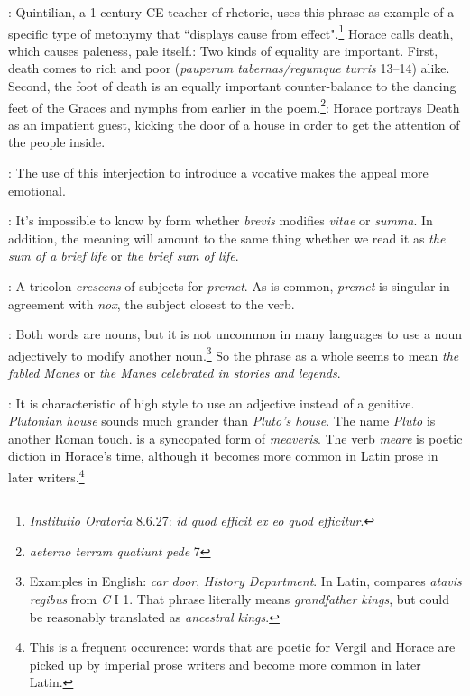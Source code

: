 
: Quintilian, a 1 century CE teacher of rhetoric, uses this phrase as example of a specific type of metonymy that ``displays cause from effect".\footnote{\textit{Institutio Oratoria} 8.6.27: \textit{id quod efficit ex eo quod efficitur}.}  Horace calls death, which causes paleness, pale itself.\indent{}: Two kinds of equality are important. First, death comes to rich and poor (\textit{pauperum tabernas/regumque turris} 13--14) alike.  Second, the foot of death is an equally important counter-balance to the dancing feet of the Graces and nymphs from earlier in the poem.\footnote{\textit{aeterno terram quatiunt pede} 7}\indent{}: Horace portrays Death as an impatient guest, kicking the door of a house in order to get the attention of the people inside.


: The use of this interjection to introduce a vocative makes the appeal more emotional.


: It's impossible to know by form whether \textit{brevis} modifies \textit{vitae} or \textit{summa}.  In addition, the meaning will amount to the same thing whether we read it as \textit{the sum of a brief life} or \textit{the brief sum of life}.


: A tricolon \textit{crescens} of subjects for \textit{premet}.  As is common, \textit{premet} is singular in agreement with \textit{nox}, the subject closest to the verb.


: Both words are nouns, but it is not uncommon in many languages to use a noun adjectively to modify another noun.\footnote{Examples in English: \textit{car door}, \textit{History Department}. In Latin, \citet[84]{mayer2012} compares \textit{atavis \lips regibus} from \textit{C} I 1.  That phrase literally means \textit{grandfather kings}, but could be reasonably translated as \textit{ancestral kings}.}  So the phrase as a whole seems to mean \textit{the fabled Manes} or \textit{the Manes celebrated in stories and legends}.


: It is characteristic of high style to use an adjective instead of a genitive.  \textit{Plutonian house} sounds much grander than \textit{Pluto's house}.  The name \textit{Pluto} is another Roman touch.\indent{} is a syncopated form of \textit{meaveris}.  The verb \textit{meare} is poetic diction in Horace's time, although it becomes more common in Latin prose in later writers.\footnote{This is a frequent occurence: words that are poetic for Vergil and Horace are picked up by imperial prose writers and become more common in later Latin.}

